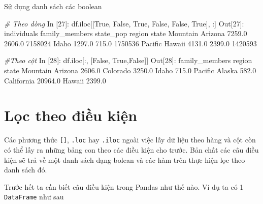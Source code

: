 \documentclass[
]{book}
\newenvironment{Shaded}{\begin{snugshade}}{\end{snugshade}}
\newcommand{\CommentTok}[1]{\textcolor[rgb]{0.56,0.35,0.01}{\textit{#1}}}
\newcommand{\DecValTok}[1]{\textcolor[rgb]{0.00,0.00,0.81}{#1}}
\newcommand{\FloatTok}[1]{\textcolor[rgb]{0.00,0.00,0.81}{#1}}
\newcommand{\NormalTok}[1]{#1}
\newcommand{\VariableTok}[1]{\textcolor[rgb]{0.00,0.00,0.00}{#1}}
\begin{document}
Sử dụng danh sách các boolean

\begin{Shaded}
\begin{Highlighting}[]
\CommentTok{\# Theo dòng}
\NormalTok{In [}\DecValTok{27}\NormalTok{]: df.iloc[[}\VariableTok{True}\NormalTok{, }\VariableTok{False}\NormalTok{, }\VariableTok{True}\NormalTok{, }\VariableTok{False}\NormalTok{, }\VariableTok{False}\NormalTok{, }\VariableTok{True}\NormalTok{], :]}
\NormalTok{Out[}\DecValTok{27}\NormalTok{]:}
\NormalTok{                  individuals  family\_members  state\_pop}
\NormalTok{region   state                                          }
\NormalTok{Mountain Arizona       }\FloatTok{7259.0}          \FloatTok{2606.0}    \DecValTok{7158024}
\NormalTok{         Idaho         }\FloatTok{1297.0}           \FloatTok{715.0}    \DecValTok{1750536}
\NormalTok{Pacific  Hawaii        }\FloatTok{4131.0}          \FloatTok{2399.0}    \DecValTok{1420593}

\CommentTok{\#Theo cột}
\NormalTok{In [}\DecValTok{28}\NormalTok{]: df.iloc[:, [}\VariableTok{False}\NormalTok{, }\VariableTok{True}\NormalTok{,}\VariableTok{False}\NormalTok{]]}
\NormalTok{Out[}\DecValTok{28}\NormalTok{]: }
\NormalTok{                     family\_members}
\NormalTok{region   state                     }
\NormalTok{Mountain Arizona             }\FloatTok{2606.0}
\NormalTok{         Colorado            }\FloatTok{3250.0}
\NormalTok{         Idaho                }\FloatTok{715.0}
\NormalTok{Pacific  Alaska               }\FloatTok{582.0}
\NormalTok{         California         }\FloatTok{20964.0}
\NormalTok{         Hawaii              }\FloatTok{2399.0}
\end{Highlighting}
\end{Shaded}

\hypertarget{lux1ecdc-theo-ux111iux1ec1u-kiux1ec7n}{%
\section{Lọc theo điều kiện}\label{lux1ecdc-theo-ux111iux1ec1u-kiux1ec7n}}

Các phương thức \texttt{{[}{]}}, \texttt{.loc} hay \texttt{.iloc} ngoài việc lấy dữ liệu theo hàng và cột còn có thể lấy ra những bảng con theo các điều kiện cho trước. Bản chất các câu điều kiện sẽ trả về một danh sách dạng bolean và các hàm trên thực hiện lọc theo danh sách đó.

Trước hết ta cần biết câu điều kiện trong Pandas như thế nào. Ví dụ ta có 1 \texttt{DataFrame} như sau
\end{document}
